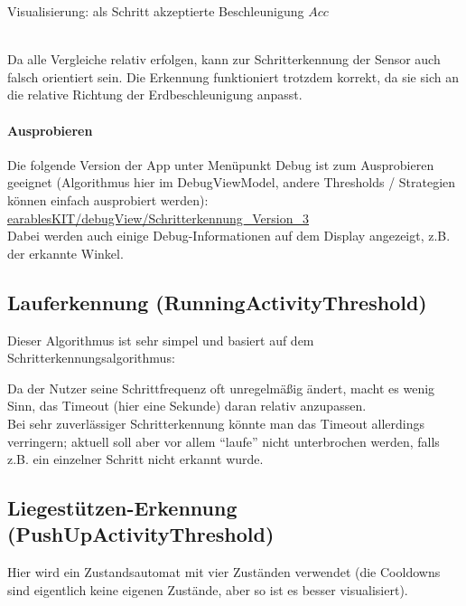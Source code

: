 \documentclass[a4paper,12pt]{article}
\begin{document}
\hspace{0.1\textwidth}
\begin{minipage}{0.35\textwidth}
	
	Visualisierung: als Schritt akzeptierte Beschleunigung $Acc$
\end{minipage}
\vspace{0.5cm}\\

Da alle Vergleiche relativ erfolgen, kann zur Schritterkennung der Sensor auch falsch orientiert sein. Die Erkennung funktioniert trotzdem korrekt, da sie sich an die relative Richtung der Erdbeschleunigung anpasst.\\
\paragraph{Ausprobieren}
Die folgende Version der App unter Menüpunkt Debug ist zum Ausprobieren geeignet (Algorithmus hier im DebugViewModel, andere Thresholds / Strategien können einfach ausprobiert werden): 
\href{https://github.com/vlle1/earablesKIT/tree/b8b34bbe0716ddb37c5afbd315e91d7f11c0270d}{earablesKIT/debugView/Schritterkennung\_Version\_3}\\
Dabei werden auch einige Debug-Informationen auf dem Display angezeigt, z.B. der erkannte Winkel.

\subsection{Lauferkennung (RunningActivityThreshold)}
Dieser Algorithmus ist sehr simpel und basiert auf dem Schritterkennungsalgorithmus: 
\newline

Da der Nutzer seine Schrittfrequenz oft unregelmäßig ändert, macht es wenig Sinn, das Timeout (hier eine Sekunde) daran relativ anzupassen.\\
Bei sehr zuverlässiger Schritterkennung könnte man das Timeout allerdings verringern; aktuell soll aber vor allem ``laufe'' nicht unterbrochen werden, falls z.B. ein einzelner Schritt nicht erkannt wurde.\\ 

\subsection{Liegestützen-Erkennung (PushUpActivityThreshold)}
Hier wird ein Zustandsautomat mit vier Zuständen verwendet (die Cooldowns sind eigentlich keine eigenen Zustände, aber so ist es besser visualisiert). 
\end{document}
